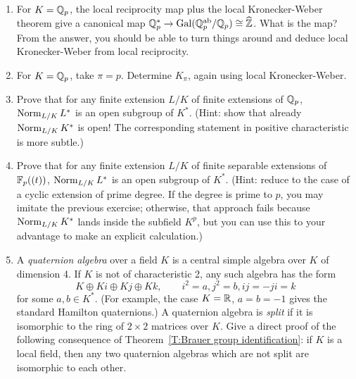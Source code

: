 
\begin{enumerate}
\item
For $K = \mathbb{Q}_p$, the local reciprocity map plus the local Kronecker-Weber
theorem give a canonical map
$\mathbb{Q}_p^* \to \operatorname{Gal}(\mathbb{Q}_p^{\operatorname{ab}}/\mathbb{Q}_p) \cong \widehat{\mathbb{Z}}$.
What is the map? From the answer, you should be able to turn things around and deduce
local Kronecker-Weber from local reciprocity.
\item
For $K = \mathbb{Q}_p$, take $\pi = p$. Determine $K_\pi$, again using
local Kronecker-Weber.
\item
Prove that for any finite extension $L/K$ of finite extensions of $\mathbb{Q}_p$,
$\operatorname{Norm}_{L/K} L^*$ is an open subgroup of $K^*$. (Hint: show that
already $\operatorname{Norm}_{L/K} K^*$ is open! The corresponding statement in positive characteristic is more subtle.)
\item
Prove that for any finite extension $L/K$ of finite separable extensions of $\mathbb{F}_p((t))$,
$\operatorname{Norm}_{L/K} L^*$ is an open subgroup of $K^*$. (Hint: reduce to the case of a cyclic extension of prime degree. If the degree is prime to $p$, you may imitate the previous exercise; otherwise, that approach fails because $\operatorname{Norm}_{L/K} K^*$ lands inside the subfield $K^p$, but you can use this to your advantage to make an explicit calculation.)
\item
A \emph{quaternion algebra} over a field $K$ is a central simple algebra over $K$ of dimension 4. If $K$ is not of characteristic 2, any such algebra has the form
\[
K \oplus Ki \oplus Kj \oplus Kk, \qquad i^2 = a, j^2 = b, ij = -ji = k
\]
for some $a,b \in K^*$. (For example, the case $K = \mathbb{R}$, $a=b=-1$ gives the standard Hamilton quaternions.) A quaternion algebra is \emph{split} if it is isomorphic to the ring of $2 \times 2$ matrices over $K$.
Give a direct proof of the following consequence of Theorem~\ref{T:Brauer group identification}: if $K$ is a local field, then any two quaternion algebras which are not split are isomorphic to each other. 

\end{enumerate}

%
